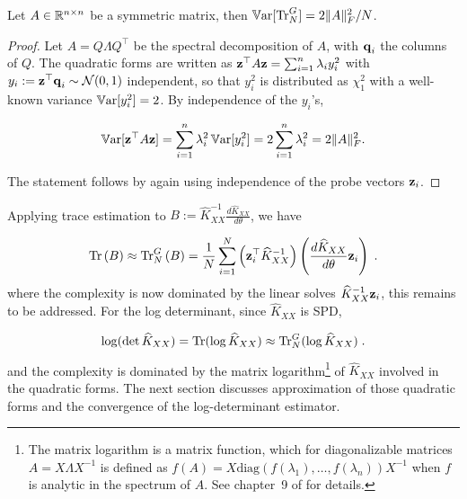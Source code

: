 \documentclass{article}
\begin{document}
\begin{proposition} \label{thm:trace_estim_variance}
Let $A \in \mathbb R^{n \times n}$ be a symmetric matrix, 
then $\operatorname{\mathbb{V}ar}[\operatorname{Tr}_N^G] = 2 \Vert A \Vert_F^2 / N$. 
\end{proposition}
\begin{proof} 
Let $A = Q \Lambda Q^\top$ be the spectral decomposition of $A$, with $\boldsymbol{\mathbf{q}}_i$ the columns of $Q$. The quadratic forms are written as $\boldsymbol{\mathbf{z}}^\top A \boldsymbol{\mathbf{z}} = \sum_{i=1}^n \lambda_i y_i^2$ with $y_i := \boldsymbol{\mathbf{z}}^\top \boldsymbol{\mathbf{q}}_i \sim \mathcal N(0, 1)$ independent, so that $y_i^2$ is distributed as $\chi^2_1$ with a well-known variance $\operatorname{\mathbb{V}ar}[y_i^2]=2$. By independence of the $y_i$'s,

\begin{equation*}
    \operatorname{\mathbb{V}ar}[\boldsymbol{\mathbf{z}}^\top A \boldsymbol{\mathbf{z}}] = \sum_{i=1}^n \lambda_i^2 \operatorname{\mathbb{V}ar}[y_i^2] = 2 \sum_{i=1}^n \lambda_i^2 = 2 \Vert A \Vert_F^2. 
\end{equation*}

The statement follows by again using independence of the probe vectors $\boldsymbol{\mathbf{z}}_i$. 
\end{proof}

Applying trace estimation to $B := \widehat K_{XX}^{-1} \frac{d \widehat K_{XX}}{d\theta}$, we have 

\begin{equation} \label{eq:trace_term}
    \operatorname{Tr} \left( B \right) 
    \approx \operatorname{Tr}_N^G \left(B \right)  
    = \frac{1}{N} \sum_{i=1}^N \left( \boldsymbol{\mathbf{z}}_i^\top \widehat K_{XX}^{-1} \right) \left( \frac{d \widehat K_{XX}}{d\theta} \boldsymbol{\mathbf{z}}_i \right) 
    \; .
\end{equation}
%
where the complexity is now dominated by the linear solves $\widehat K_{XX}^{-1} \boldsymbol{\mathbf{z}}_i$, this remains to be addressed. For the log determinant, since $\widehat K_{XX}$ is SPD, 

\begin{equation*}
    \log (\det \widehat K_{XX}) = \operatorname{Tr} (\log \widehat K_{XX}) \approx \operatorname{Tr}_N^G (\log \widehat K_{XX}) \; .
\end{equation*}
%
and the complexity is dominated by the matrix logarithm\footnote{The matrix logarithm is a matrix function, which for diagonalizable matrices $A = X\Lambda X^{-1}$ is defined as $f(A) = X\text{diag}(f(\lambda_1), \ldots, f(\lambda_n)) X^{-1}$ when $f$ is analytic in the spectrum of $A$. See chapter~9 of \cite{golub_matrix_2013} for details.} of $\widehat K_{XX}$ involved in the quadratic forms. The next section discusses approximation of those quadratic forms and the convergence of the log-determinant estimator. 
\end{document}
